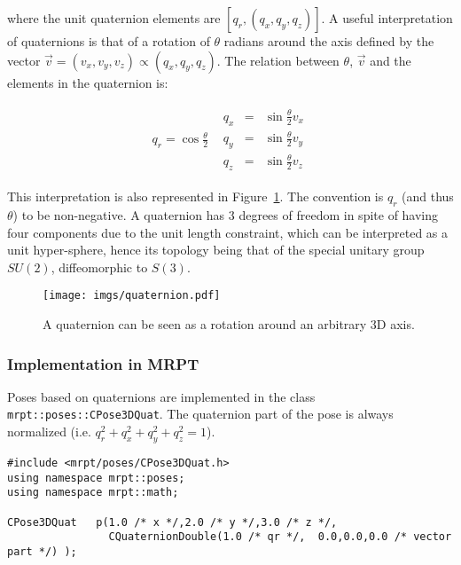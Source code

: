 \documentclass[a4paper,11pt]{report}
\begin{document}
\noindent where the unit quaternion elements are $[q_r, (q_x,q_y,q_z)]$. A useful interpretation of quaternions
is that of a rotation of $\theta$ radians around the axis defined by the vector $\vec{v} = (v_x,v_y,v_z) \propto (q_x,q_y,q_z)$.
The relation between $\theta$, $\vec{v}$ and the elements in the quaternion is:

\begin{equation*}
\begin{array}{cc}
q_r = \cos\frac{\theta}{2}  &
  \begin{array}{rcl}
    q_x &=& \sin\frac{\theta}{2} v_x  \\
    q_y &=& \sin\frac{\theta}{2} v_y  \\
    q_z &=& \sin\frac{\theta}{2} v_z
  \end{array}
\end{array}
\end{equation*}

This interpretation is also represented in Figure~\ref{fig:quat}.
The convention is $q_r$ (and thus $\theta$) to be non-negative.
A quaternion has 3 degrees of freedom in spite of having four components
due to the unit length constraint, which can be interpreted as a unit hyper-sphere, 
hence its topology being that of the special unitary group $SU(2)$, diffeomorphic to $S(3)$.


\begin{figure}[h]
\centering
\texttt{[image: imgs/quaternion.pdf]}
\caption{A quaternion can be seen as a rotation around an arbitrary 3D axis.}
\label{fig:quat}
\end{figure}


\subsubsection{Implementation in MRPT}

Poses based on quaternions are implemented in the class \texttt{mrpt::poses::CPose3DQuat}.
The quaternion part of the pose is always normalized (i.e. $q_r^2+q_x^2+q_y^2+q_z^2=1$).

\begin{lstlisting}
#include <mrpt/poses/CPose3DQuat.h>
using namespace mrpt::poses;
using namespace mrpt::math;

CPose3DQuat   p(1.0 /* x */,2.0 /* y */,3.0 /* z */,
                CQuaternionDouble(1.0 /* qr */,  0.0,0.0,0.0 /* vector part */) );
\end{lstlisting}
\end{document}
